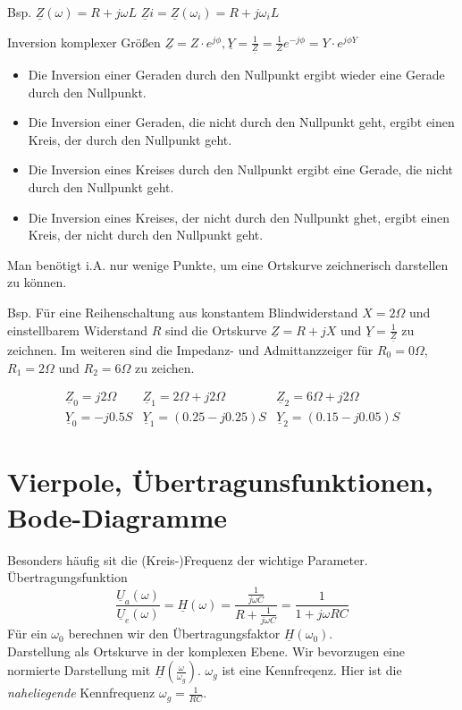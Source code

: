 \documentclass[german]{article}
\newcommand{\ohm}{\Omega}
\begin{document}
Bsp. %
$\underline{Z}(\omega) = R + j\omega L$
$\underline{Z}i = \underline{Z}(\omega_i) = R + j\omega_i L$

Inversion komplexer Größen
$\underline{Z} = Z \cdot e^{j\phi}, \underline{Y} = \frac1{\underline{Z}} = \frac1Z e^{-j\phi} = Y \cdot e^{j\phi Y}$

\begin{itemize}
	\item Die Inversion einer Geraden durch den Nullpunkt ergibt wieder eine Gerade durch den Nullpunkt.
	\item Die Inversion einer Geraden, die nicht durch den Nullpunkt geht, ergibt einen Kreis, der durch den Nullpunkt geht.
	\item Die Inversion eines Kreises durch den Nullpunkt ergibt eine Gerade, die nicht durch den Nullpunkt geht.
	\item Die Inversion eines Kreises, der nicht durch den Nullpunkt ghet, ergibt einen Kreis, der nicht durch den Nullpunkt geht.
\end{itemize}

Man benötigt i.A. nur wenige Punkte, um eine Ortskurve zeichnerisch darstellen zu können.

Bsp. Für eine Reihenschaltung aus konstantem Blindwiderstand $X=2\ohm$ und einstellbarem Widerstand $R$ sind die Ortskurve $\underline{Z} = R + jX$ und $\underline{Y} = \frac1{\underline{Z}}$ zu zeichnen. Im weiteren sind die Impedanz- und Admittanzzeiger für $R_0 = 0 \ohm$, $R_1 = 2 \ohm$ und $R_2 = 6 \ohm$ zu zeichen.

\begin{eqnarray*}
	\underline{Z}_0 = j 2\ohm & \underline{Z}_1 = 2\ohm + j 2\ohm & \underline{Z}_2 = 6 \ohm + j 2\ohm \\
	\underline{Y}_0 = - j 0.5S & \underline{Y}_1 = (0.25 - j0.25)S & \underline{Y}_2 = (0.15 - j0.05)S
\end{eqnarray*}

\section{Vierpole, Übertragunsfunktionen, Bode-Diagramme}
Besonders häufig sit die (Kreis-)Frequenz der wichtige Parameter.
Übertragungsfunktion
\[\frac{\underline{U}_a(\omega)}{\underline{U}_e(\omega)} = \underline{H}(\omega) = \frac{\frac1{j\omega C}}{R + \frac1{j\omega C}} = \frac1{1 + j\omega RC}\]
Für ein $\omega_0$ berechnen wir den Übertragungsfaktor $\underline{H}(\omega_0)$. \\
Darstellung als Ortskurve in der komplexen Ebene. Wir bevorzugen eine normierte Darstellung mit $\underline{H}(\frac{\omega}{\omega_g})$. $\omega_g$ ist eine Kennfreqenz. Hier ist die {\it naheliegende} Kennfrequenz $\omega_g = \frac1{RC}$.
\end{document}
